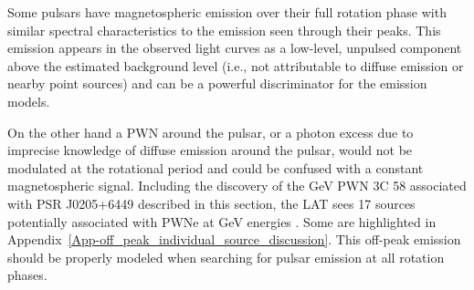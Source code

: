 Some pulsars have magnetospheric emission over their full rotation phase with similar spectral characteristics to the emission seen through their peaks.
This emission appears in the observed light curves as a low-level,
unpulsed component above the estimated background level (i.e., not
attributable to diffuse emission or nearby point sources) and can be a
powerful discriminator for the emission models.

On the other hand a PWN around the pulsar, or a photon excess due to imprecise knowledge of
diffuse emission around the pulsar, would not be modulated at the rotational period and could be confused with a constant magnetospheric signal. 
Including the discovery of the GeV PWN 3C 58 associated with PSR J0205+6449 described in this section, 
the LAT sees 17 sources potentially associated with PWNe at GeV energies \citep{Rousseau2013}. 
Some are highlighted in Appendix~\ref{App-off_peak_individual_source_discussion}.
This off-peak emission should be properly modeled when searching for pulsar emission at all rotation phases.




